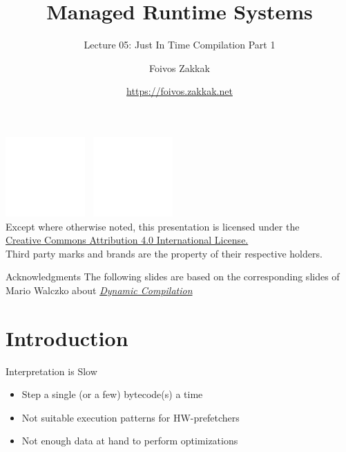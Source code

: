 \documentclass[
14pt,
aspectratio=169,
usenames,
dvipsnames,
x11names]{beamer}
\title{Managed Runtime Systems}
\subtitle{Lecture 05: Just In Time Compilation Part 1}
\author[\url{https://foivos.zakkak.net}]{Foivos Zakkak}
\date{\url{https://foivos.zakkak.net}}
\begin{document}


\begin{frame}[plain]
  \titlepage
  \centering
  \includegraphics[height=.75cm]{cc}~
  \includegraphics[height=.75cm]{by}\\[1em]
  \scriptsize{Except where otherwise noted, this presentation is licensed under the\\
    \href{http://creativecommons.org/licenses/by/4.0/}%
    {Creative Commons Attribution 4.0 International License.}\\[1ex]
    Third party marks and brands are the property of their respective
    holders.}
\end{frame}


\begin{frame}{Acknowledgments}
  The following slides are based on the corresponding slides of Mario Walczko about \href{https://www.dropbox.com/s/hqc2axihgvxtadf/10\%20Dynamic\%20compilation.pdf}{\emph{Dynamic Compilation}}
\end{frame}

\section{Introduction}

\begin{frame}{Interpretation is Slow}
  \begin{itemize}  \setlength{\itemsep}{\fill}
  \item Step a single (or a few) bytecode(s) a time
  \item Not suitable execution patterns for HW-prefetchers
  \item Not enough data at hand to perform optimizations
  \end{itemize}
\end{frame}
\end{document}
